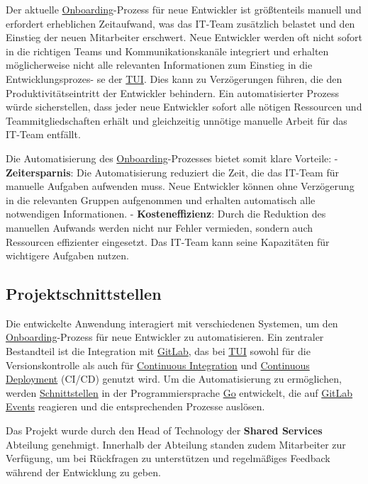 Der aktuelle \hyperlink{Onboarding}{\textcolor{AOBlau}{Onboarding}}-Prozess für neue Entwickler ist größtenteils manuell und erfordert erheblichen Zeitaufwand, was das IT-Team zusätzlich belastet und den Einstieg der neuen Mitarbeiter erschwert. Neue Entwickler werden oft nicht sofort in die richtigen Teams und Kommunikationskanäle integriert und erhalten möglicherweise nicht alle relevanten Informationen zum Einstieg in die Entwicklungsprozes-
se der \hyperlink{TUI}{\textcolor{AOBlau}{TUI}}. Dies kann zu Verzögerungen führen, die den Produktivitätseintritt der Entwickler behindern. Ein automatisierter Prozess würde sicherstellen, dass jeder neue Entwickler sofort alle nötigen Ressourcen und Teammitgliedschaften erhält und gleichzeitig unnötige manuelle Arbeit für das IT-Team entfällt.

Die Automatisierung des \hyperlink{Onboarding}{\textcolor{AOBlau}{Onboarding}}-Prozesses bietet somit klare Vorteile:
- \textbf{Zeitersparnis}: Die Automatisierung reduziert die Zeit, die das IT-Team für manuelle Aufgaben aufwenden muss. Neue Entwickler können ohne Verzögerung in die relevanten Gruppen aufgenommen und erhalten automatisch alle notwendigen Informationen.
- \textbf{Kosteneffizienz}: Durch die Reduktion des manuellen Aufwands werden nicht nur Fehler vermieden, sondern auch Ressourcen effizienter eingesetzt. Das IT-Team kann seine Kapazitäten für wichtigere Aufgaben nutzen.


\subsection{Projektschnittstellen} 
\label{sec:Projektschnittstellen}

Die entwickelte Anwendung interagiert mit verschiedenen Systemen, um den \hyperlink{Onboarding}{\textcolor{AOBlau}{Onboarding}}-Prozess für neue Entwickler zu automatisieren. Ein zentraler Bestandteil ist die Integration mit \hyperlink{GitLab}{\textcolor{AOBlau}{GitLab}}, das bei \hyperlink{TUI}{\textcolor{AOBlau}{TUI}} sowohl für die Versionskontrolle als auch für \hyperlink{CI}{\textcolor{AOBlau}{Continuous Integration}} und \hyperlink{CD}{\textcolor{AOBlau}{Continuous Deployment}} (CI/CD) genutzt wird. Um die Automatisierung zu ermöglichen, werden \hyperlink{Schnittstelle}{\textcolor{AOBlau}{Schnittstellen}} in der Programmiersprache \hyperlink{Go}{\textcolor{AOBlau}{Go}} entwickelt, die auf \hyperlink{GitLab}{\textcolor{AOBlau}{GitLab Events}} reagieren und die entsprechenden Prozesse auslösen.

Das Projekt wurde durch den Head of Technology der \textbf{Shared Services} Abteilung genehmigt. Innerhalb der Abteilung standen zudem Mitarbeiter zur Verfügung, um bei Rückfragen zu unterstützen und regelmäßiges Feedback während der Entwicklung zu geben.

